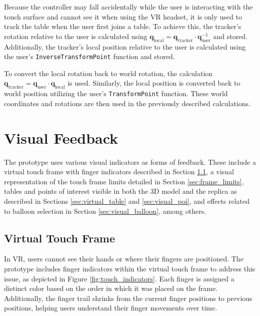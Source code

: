     Because the controller may fall accidentally while the user is interacting with the touch surface and cannot see it when using the VR headset, it is only used to track the table when the user first joins a table. To achieve this, the tracker's rotation relative to the user is calculated using $\mathbf{q}_{\mathrm{local}} = \mathbf{q}_{\mathrm{tracker}} \cdot \mathbf{q}_{\mathrm{user}}^{-1}$ and stored. Additionally, the tracker's local position relative to the user is calculated using the user's \lstinline{InverseTransformPoint} function and stored.

    To convert the local rotation back to world rotation, the calculation  $\mathbf{q}_{\mathrm{tracker}} = \mathbf{q}_{\mathrm{user}} \cdot \mathbf{q}_{\mathrm{local}}$ is used. Similarly, the local position is converted back to world position utilizing the user's \lstinline{TransformPoint} function. These world coordinates and rotations are then used in the previously described calculations.

\section{Visual Feedback}

    The prototype uses various visual indicators as forms of feedback. These include a virtual touch frame with finger indicators described in Section \ref{sec:touch_frame}, a visual representation of the touch frame limits detailed in Section \ref{sec:frame_limits}, tables and points of interest visible in both the 3D model and the replica as described in Sections \ref{sec:virtual_table} and \ref{sec:visual_poi}, and effects related to balloon selection in Section \ref{sec:visual_balloon}, among others.

    \subsection{Virtual Touch Frame} \label{sec:touch_frame}

        In VR, users cannot see their hands or where their fingers are positioned. The prototype includes finger indicators within the virtual touch frame to address this issue, as depicted in Figure \ref{fig:touch_indicators}. Each finger is assigned a distinct color based on the order in which it was placed on the frame. Additionally, the finger trail shrinks from the current finger positions to previous positions, helping users understand their finger movements over time.
      
